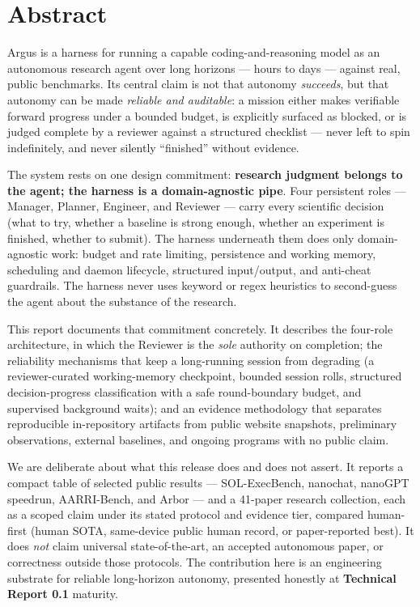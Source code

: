 \section{Abstract}
\label{sec:abstract}

Argus is a harness for running a capable coding-and-reasoning model as an
autonomous research agent over long horizons --- hours to days --- against real,
public benchmarks. Its central claim is not that autonomy \emph{succeeds}, but
that autonomy can be made \emph{reliable and auditable}: a mission either makes
verifiable forward progress under a bounded budget, is explicitly surfaced as
blocked, or is judged complete by a reviewer against a structured checklist ---
never left to spin indefinitely, and never silently ``finished'' without
evidence.

The system rests on one design commitment: \textbf{research judgment belongs to
the agent; the harness is a domain-agnostic pipe}. Four persistent roles ---
Manager, Planner, Engineer, and Reviewer --- carry every scientific decision
(what to try, whether a baseline is strong enough, whether an experiment is
finished, whether to submit). The harness underneath them does only
domain-agnostic work: budget and rate limiting, persistence and working memory,
scheduling and daemon lifecycle, structured input/output, and anti-cheat
guardrails. The harness never uses keyword or regex heuristics to second-guess
the agent about the substance of the research.

This report documents that commitment concretely. It describes the four-role
architecture, in which the Reviewer is the \emph{sole} authority on completion;
the reliability mechanisms that keep a long-running session from degrading
(a reviewer-curated working-memory checkpoint, bounded session rolls, structured
decision-progress classification with a safe round-boundary budget, and
supervised background waits); and an evidence methodology that separates
reproducible in-repository artifacts from public website snapshots, preliminary
observations, external baselines, and ongoing programs with no public claim.

We are deliberate about what this release does and does not assert. It reports a
compact table of selected public results --- SOL-ExecBench, nanochat, nanoGPT
speedrun, AARRI-Bench, and Arbor --- and a 41-paper research collection, each as a
scoped claim under its stated protocol and evidence tier, compared human-first
(human SOTA, same-device public human record, or paper-reported best). It does
\emph{not} claim universal state-of-the-art, an accepted autonomous paper, or
correctness outside those protocols. The contribution here is an engineering
substrate for reliable long-horizon autonomy, presented honestly at
\textbf{Technical Report 0.1} maturity.
